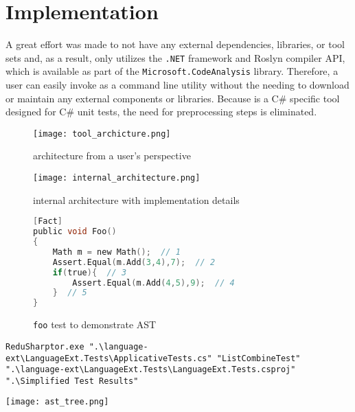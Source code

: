 \section{Implementation}
A great effort was made to not have any external dependencies, libraries, or tool sets and, as a result, \mytool only utilizes the \texttt{.NET} framework and Roslyn compiler API, which is available as part of the \texttt{Microsoft.CodeAnalysis} library. Therefore, a user can easily invoke \mytool as a command line utility without the needing to download or maintain any external components or libraries. Because \mytool is a C\# specific tool designed for C\# unit tests, the need for preprocessing steps is eliminated.


\begin{center}
\begin{figure}[!ht]
\texttt{[image: tool\_archicture.png]}
\caption{\mytool architecture from a user's perspective}
\label{fig:tool_architecture}
\end{figure}
\end{center}

\begin{center}
\begin{figure}[!ht]
\texttt{[image: internal\_architecture.png]}
\caption{\mytool internal architecture with implementation details}
\label{fig:internal}
\end{figure}
\end{center}


\begin{figure}
\begin{lstlisting}[language=C, linewidth=0.6\linewidth]
[Fact]
public void Foo()
{
	Math m = new Math();  // 1
	Assert.Equal(m.Add(3,4),7);  // 2
	if(true){  // 3
		Assert.Equal(m.Add(4,5),9);  // 4
	}  // 5
}
\end{lstlisting}
\caption{\texttt{foo} test to demonstrate AST}
\label{fig:foo}
\end{figure}


\begin{figure*}
\begin{lstlisting}
ReduSharptor.exe ".\language-ext\LanguageExt.Tests\ApplicativeTests.cs" "ListCombineTest" ".\language-ext\LanguageExt.Tests\LanguageExt.Tests.csproj" ".\Simplified Test Results"
\end{lstlisting}
\caption{\texttt command line execution of \mytool}
\label{fig:foo}
\end{figure*}


\begin{figure*}
\texttt{[image: ast\_tree.png]}
\caption{AST of code in Figure~\ref{fig:foo}}
\label{fig:ast}
\end{figure*}

